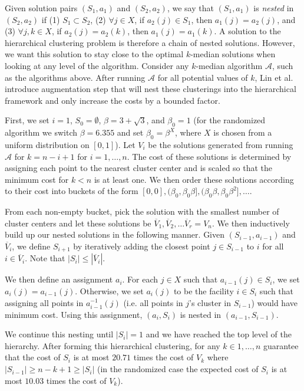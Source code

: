 \documentclass{article}
\begin{document}
Given solution pairs $(S_1, a_1)$ and $(S_2, a_2)$, we say that $(S_1, a_1)$ is \emph{nested} in $(S_2, a_2)$ if  (1) $S_1 \subset S_2$, (2)  $\forall  j \in X$, if $a_2(j) \in S_1$, then $a_1(j) = a_2(j)$, and (3) $\forall j, k \in X$, if $a_2(j) = a_2(k)$, then $a_1(j) = a_1(k)$.
 A solution to the hierarchical clustering problem is therefore a chain of nested solutions. However, we want this solution to stay close to the optimal $k$-median solutions when looking at any level of the algorithm.  
Consider any $k$-median algorithm $\mathcal{A}$, such as the algorithms above. After running $\mathcal{A}$ for all potential values of $k$, Lin et al.~\cite{Lin} introduce  augmentation step that will nest these clusterings into the hierarchical framework and only increase the costs by a bounded factor. 

First, we set $i=1$, $S_0 = \emptyset$, $\beta = 3+\sqrt{3}$, and $\beta_0 = 1$ (for the randomized algorithm we switch $\beta = 6.355$ and set $\beta_0 = \beta^X$, where $X$ is chosen from a uniform distribution on $[0,1]$). Let $V_i$ be the solutions generated from running $\mathcal{A}$ for $k=n-i+1$ for $i=1, \ldots, n$. The cost of these solutions is determined by assigning each point to the nearest cluster center and is scaled so that the minimum cost for $k<n$ is at least one. We then order these solutions according to their cost into buckets of the form $[0,0], (\beta_0, \beta_0 \beta], (\beta_0 \beta, \beta_0 \beta^2], \ldots $. 

From each non-empty bucket, pick the solution with the smallest number of cluster centers and let these solutions be $\overline{V}_1, \overline{V}_2, \ldots \overline{V}_r = V_n$. We then inductively build up our nested solutions in the following manner. Given $(S_{i-1}, a_{i-1})$ and $\overline{V}_i$, we define $S_{i+1}$ by iteratively adding the closest point $j \in S_{i-1}$ to $i$ for all $i \in \overline{V}_i$. Note that $|S_{i}| \leq |\overline{V}_i|$. 

We then define an assignment $a_i$. For each $j \in X$ such that $a_{i-1}(j) \in S_{i}$, we set $a_i(j) = a_{i-1}(j)$. Otherwise, we set $a_i(j)$ to be the facility $i \in S_i$ such that assigning all points in $a_{i-1}^{-1}(j)$ (i.e. all points in $j$'s cluster in $S_{i-1}$) would have minimum cost. Using this assignment, $(a_i, S_i)$ is nested in $(a_{i-1}, S_{i-1})$. 

We continue this nesting until $|S_i| = 1$ and we have reached the top level of the hierarchy. After forming this hierarchical clustering, for any $k \in 1, \ldots, n$ \cite{Lin} guarantee that the cost of $S_i$ is at most $20.71$ times the cost of $V_k$ where $|S_{i-1}| \geq n-k+1 \geq |S_{i}|$ (in the randomized case the expected cost of $S_i$ is at most $10.03$ times the cost of $V_k$).
\end{document}
